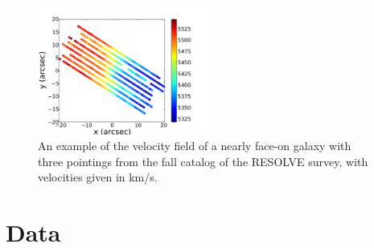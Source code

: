 \documentclass{emulateapj}
\begin{document}
\begin{figure}
\includegraphics[width=0.5\textwidth]{rf0071example.pdf}
\caption{An example of the velocity field of a nearly face-on galaxy with three pointings from the fall catalog of the RESOLVE survey, with velocities given in km/s. \label{fig:test}}
\end{figure}


\section{Data}
\end{document}
